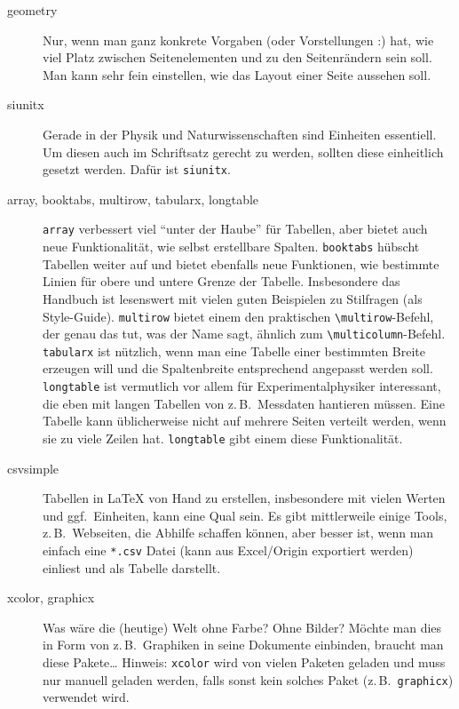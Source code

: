 \documentclass[11pt,
               a4paper,
               parskip=half,
               ]{scrartcl}
\newcommand{\zB}{z.\,B.\xspace}
\newcommand{\textsw}[1]{\texttt{#1}} %
\newcommand{\file}[1]{\texttt{#1}} %
\begin{document}
\begin{description}
  \item[geometry] Nur, wenn man ganz konkrete Vorgaben
    (oder Vorstellungen :) hat, wie viel Platz zwischen Seitenelementen
    und zu den Seitenrändern sein soll.
    Man kann sehr fein einstellen, wie das Layout einer Seite aussehen soll.

  \item[siunitx] Gerade in der Physik und Naturwissenschaften
    sind Einheiten essentiell.
    Um diesen auch im Schriftsatz gerecht zu werden,
    sollten diese einheitlich gesetzt werden.
    Dafür ist \textsw{siunitx}.

  \item[array, booktabs, multirow, tabularx, longtable]
    \textsw{array} verbessert viel \enquote{unter der Haube}
    für Tabellen, aber bietet auch neue Funktionalität,
    wie selbst erstellbare Spalten.
    \textsw{booktabs} hübscht Tabellen weiter auf
    und bietet ebenfalls neue Funktionen,
    wie bestimmte Linien für obere und untere Grenze der Tabelle.
    Insbesondere das Handbuch ist lesenswert
    mit vielen guten Beispielen zu Stilfragen (als Style-Guide).
    \textsw{multirow} bietet einem den praktischen \verb+\multirow+-Befehl,
    der genau das tut, was der Name sagt,
    ähnlich zum \verb+\multicolumn+-Befehl.
    \textsw{tabularx} ist nützlich,
    wenn man eine Tabelle einer bestimmten Breite erzeugen will
    und die Spaltenbreite entsprechend angepasst werden soll.
    \textsw{longtable} ist vermutlich vor allem
    für Experimentalphysiker interessant,
    die eben mit langen Tabellen von \zB~Messdaten hantieren müssen.
    Eine Tabelle kann üblicherweise nicht auf mehrere Seiten verteilt werden,
    wenn sie zu viele Zeilen hat.
    \textsw{longtable} gibt einem diese Funktionalität.

  \item[csvsimple] Tabellen in \LaTeX{} von Hand zu erstellen,
    insbesondere mit vielen Werten und ggf.~Einheiten, kann eine Qual sein.
    Es gibt mittlerweile einige Tools, \zB~Webseiten,
    die Abhilfe schaffen können, aber besser ist,
    wenn man einfach eine \file{*.csv} Datei
    (kann aus Excel/Origin exportiert werden)
    einliest und als Tabelle darstellt.

  \item[xcolor, graphicx] Was wäre die (heutige) Welt ohne Farbe?
    Ohne Bilder?
    Möchte man dies in Form von \zB~Graphiken in seine Dokumente einbinden,
    braucht man diese Pakete\dots
    Hinweis: \textsw{xcolor} wird von vielen Paketen geladen
    und muss nur manuell geladen werden,
    falls sonst kein solches Paket (\zB~\textsw{graphicx}) verwendet wird.


\end{description}
\end{document}

